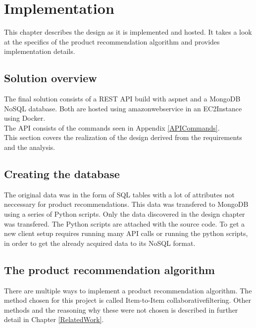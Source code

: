 
\chapter{Implementation} %

\label{Implementation} %

This chapter describes the design as it is implemented and hosted. It takes a look at the specifics of the product recommendation algorithm and provides implementation details.

\section{Solution overview}

The final solution consists of a \gls{REST} \gls{API} build with \gls{aspnet} and a \gls{MongoDB} \gls{NoSQL} database. Both are hosted using \gls{amazonwebservice} in an \gls{EC2Instance} using \gls{Docker}. \\
The \gls{API} consists of the commands seen in Appendix \ref{APICommands}. \\
This section covers the realization of the design derived from the requirements and the analysis.

\section{Creating the database}
The original data was in the form of SQL tables with a lot of attributes not neccessary for product recommendations. 
This data was transfered to \gls{MongoDB} using a series of Python scripts. Only the data discovered in the design chapter was transfered. The Python scripts are attached with the source code.
To get a new client setup requires running many \gls{API} calls or running the python scripts, in order to get the already acquired data to its \gls{NoSQL} format.

\section{The product recommendation algorithm}
There are multiple ways to implement a product recommendation algorithm. The method chosen for this project is called Item-to-Item \gls{collaborativefiltering}. Other methods and the reasoning why these were not chosen is described in further detail in Chapter \ref{RelatedWork}. \\\\

